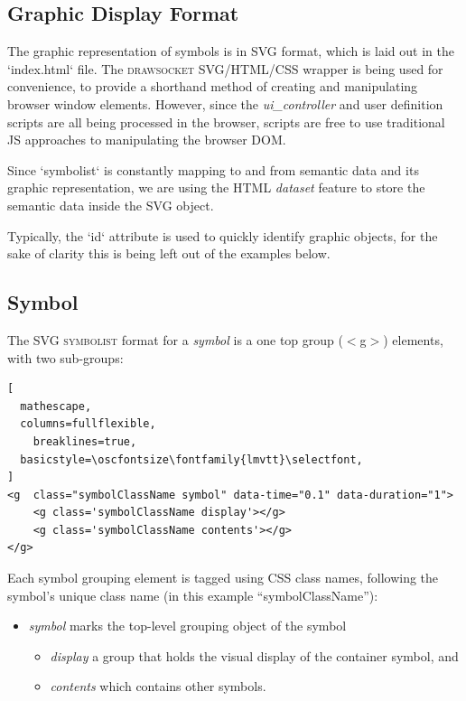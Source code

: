 \documentclass{article}
\def\symbolist{\textsc{symbolist}\xspace}
\def\drawsocket{\textsc{drawsocket}\xspace}
\def\oscfontsize{\footnotesize}
\begin{document}
\subsection{Graphic Display Format}\label{subsec:file_format}

The graphic representation of symbols is in SVG format, which is laid out in the `index.html` file. The \drawsocket SVG/HTML/CSS wrapper is being used for convenience, to provide a shorthand method of creating and manipulating browser window elements. However, since the \textit{ui\_controller} and user definition scripts are all being processed in the browser, scripts are free to use traditional JS approaches to manipulating the browser DOM.

Since `symbolist` is constantly mapping to and from semantic data and its graphic representation, we are using the HTML \textit{dataset} feature to store the semantic data inside the SVG object.

Typically, the `id` attribute is used to quickly identify graphic objects, for the sake of clarity this is being left out of the examples below.

\subsection{Symbol}\label{subsec:symbol}

\begin{minipage}{\linewidth}
The SVG \symbolist format for a \textit{symbol} is a one top group ($<$g$>$) elements, with two sub-groups:

\begin{lstlisting}[
  mathescape,
  columns=fullflexible,
    breaklines=true,
  basicstyle=\oscfontsize\fontfamily{lmvtt}\selectfont,
]
<g  class="symbolClassName symbol" data-time="0.1" data-duration="1">
    <g class='symbolClassName display'></g>
    <g class='symbolClassName contents'></g>
</g>
\end{lstlisting}
\end{minipage}



Each symbol grouping element is tagged using CSS class names, following the symbol's unique class name (in this example ``symbolClassName''):
\begin{itemize}\itemsep0pt 
\item \textit{symbol} marks the top-level grouping object of the symbol
\begin{itemize}\itemsep0pt 
  \item \textit{display} a group that holds the visual display of the container symbol, and
  \item \textit{contents} which contains other symbols.
  \end{itemize}
\end{itemize}
\end{document}
